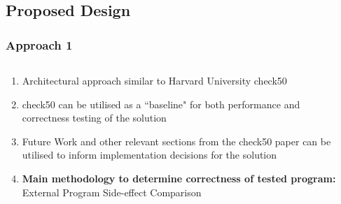\documentclass[xcolor]{beamer}
\begin{document}
\subsection{Proposed Design}
\begin{frame}[fragile]
	\frametitle{Approach 1}
	\begin{columns}
		\begin{column}{0.6\textwidth}
			\begin{enumerate}
				\setlength\itemsep{0.70em}
				\item Architectural approach similar to Harvard University check50
				\item check50 can be utilised as a ``baseline" for both performance and correctness testing of the solution
				\item Future Work and other relevant sections from the check50 paper can be utilised to inform implementation decisions for the solution
				\item \textbf{Main methodology to determine correctness of tested program:} External Program Side-effect Comparison
			\end{enumerate}
		\end{column}
		\begin{column}{0.35\textwidth}
			\centering
		\end{column}
	\end{columns}
\end{frame}
\end{document}
